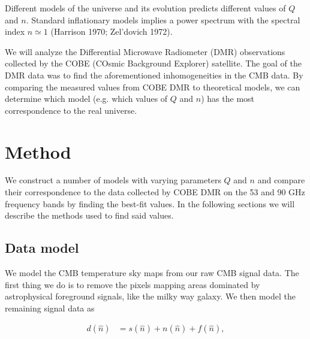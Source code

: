 \documentclass{emulateapj}
\begin{document}
Different models of the universe and its evolution predicts different values of $Q$ and $n$. Standard inflationary models implies a power spectrum with the spectral index $n \simeq 1$ (Harrison 1970; Zel'dovich 1972). 

We will analyze the Differential Microwave Radiometer (DMR) observations collected by the COBE (COsmic Background Explorer) satellite. The goal of the DMR data was to find the aforementioned  inhomogeneities in the CMB data. By comparing the measured values from COBE DMR to theoretical models, we can determine which model (e.g. which values of $Q$ and $n$) has the most correspondence to the real universe. 














\section{Method}
\label{sec:method}
 
We construct a number of models with varying parameters $Q$ and $n$ and compare their correspondence to the data collected by COBE DMR on the 53 and 90 GHz frequency bands by finding the best-fit values. In the following sections we will describe the methods used to find said values.

 
\subsection{ Data model}
We model the CMB temperature sky maps from our raw CMB signal data. The first thing we do is to remove the pixels mapping areas dominated by astrophysical foreground signals, like the milky way galaxy. We then model the remaining signal data as
 
\begin{equation}
 \label{dn}
 \begin{array}{rl}
 d(\hat{n})  &= s(\hat{n}) + n(\hat{n}) + f(\hat{n}), \\
 \end{array}
\end{equation}
 
\end{document}
